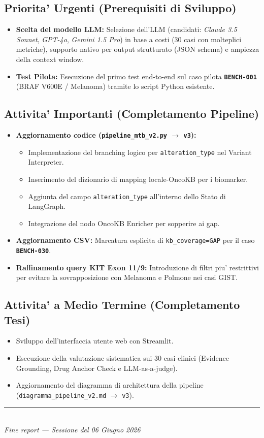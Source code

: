 \documentclass[12pt, a4paper]{article}
\newcommand{\bench}[1]{{\texttt{\textbf{#1}}}}
\begin{document}
\subsection{Priorita' Urgenti (Prerequisiti di Sviluppo)}
\begin{itemize}[leftmargin=1.6em, itemsep=3pt]
  \item \textbf{Scelta del modello LLM:} Selezione dell'LLM (candidati: \textit{Claude 3.5 Sonnet}, \textit{GPT-4o}, \textit{Gemini 1.5 Pro}) in base a costi (30 casi con molteplici metriche), supporto nativo per output strutturato (JSON schema) e ampiezza della context window.
  \item \textbf{Test Pilota:} Esecuzione del primo test end-to-end sul caso pilota \bench{BENCH-001} (BRAF V600E / Melanoma) tramite lo script Python esistente.
\end{itemize}

\subsection{Attivita' Importanti (Completamento Pipeline)}
\begin{itemize}[leftmargin=1.6em, itemsep=3pt]
  \item \textbf{Aggiornamento codice (\texttt{pipeline\_mtb\_v2.py} $\to$ \texttt{v3}):}
        \begin{itemize}[itemsep=2pt, leftmargin=1.2em]
          \item Implementazione del branching logico per \texttt{alteration\_type} nel Variant Interpreter.
          \item Inserimento del dizionario di mapping locale-OncoKB per i biomarker.
          \item Aggiunta del campo \texttt{alteration\_type} all'interno dello Stato di LangGraph.
          \item Integrazione del nodo OncoKB Enricher per sopperire ai gap.
        \end{itemize}
  \item \textbf{Aggiornamento CSV:} Marcatura esplicita di \texttt{kb\_coverage=GAP} per il caso \bench{BENCH-030}.
  \item \textbf{Raffinamento query KIT Exon 11/9:} Introduzione di filtri piu' restrittivi per evitare la sovrapposizione con Melanoma e Polmone nei casi GIST.
\end{itemize}

\subsection{Attivita' a Medio Termine (Completamento Tesi)}
\begin{itemize}[leftmargin=1.6em, itemsep=2pt]
  \item Sviluppo dell'interfaccia utente web con Streamlit.
  \item Esecuzione della valutazione sistematica sui 30 casi clinici (Evidence Grounding, Drug Anchor Check e LLM-as-a-judge).
  \item Aggiornamento del diagramma di architettura della pipeline (\texttt{diagramma\_pipeline\_v2.md} $\to$ \texttt{v3}).
\end{itemize}

\vfill
\begin{center}
  {\color{medgray}\rule{0.5\linewidth}{0.4pt}}\\[0.3em]
  {\small\color{medgray}\textit{Fine report --- Sessione del 06 Giugno 2026}}
\end{center}
\end{document}
